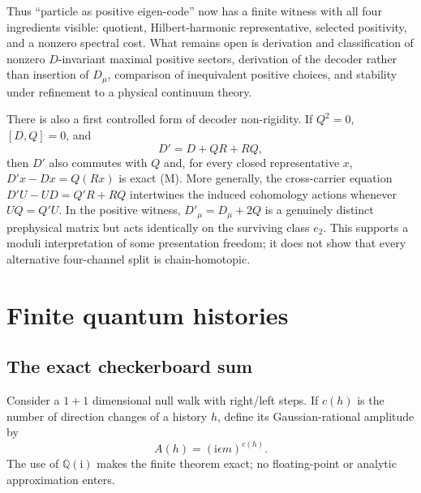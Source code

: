 \documentclass[11pt]{article}
\newcommand{\Mtag}{\textcolor{verified}{\textsc{M}}}
\newcommand{\ii}{\mathrm{i}}
\newcommand{\Q}{\mathbb{Q}}
\begin{document}
Thus ``particle as positive eigen-code'' now has a finite witness with all four
ingredients visible: quotient, Hilbert-harmonic representative, selected
positivity, and a nonzero spectral cost.  What remains open is derivation and
classification of nonzero $D$-invariant maximal positive sectors, derivation of
the decoder rather than insertion of $D_\mu$, comparison of inequivalent
positive choices, and stability under refinement to a physical continuum
theory.

There is also a first controlled form of decoder non-rigidity.  If $Q^2=0$,
$[D,Q]=0$, and
\begin{equation}\label{eq:chainGauge}
  D'=D+QR+RQ,
\end{equation}
then $D'$ also commutes with $Q$ and, for every closed representative $x$,
$D'x-Dx=Q(Rx)$ is exact (\Mtag).  More generally, the cross-carrier equation
$D'U-UD=Q'R+RQ$ intertwines the induced cohomology actions whenever
$UQ=Q'U$.  In the positive witness, $D'_\mu=D_\mu+2Q$ is a genuinely distinct
prephysical matrix but acts identically on the surviving class $e_2$.  This
supports a moduli interpretation of some presentation freedom; it does not show
that every alternative four-channel split is chain-homotopic.

\section{Finite quantum histories}

\subsection{The exact checkerboard sum}

Consider a $1+1$ dimensional null walk with right/left steps.  If $c(h)$ is the
number of direction changes of a history $h$, define its Gaussian-rational
amplitude by
\begin{equation}\label{eq:historyamp}
  A(h)=(\ii\epsilon m)^{c(h)}.
\end{equation}
The use of $\Q(\ii)$ makes the finite theorem exact; no floating-point or
analytic approximation enters.
\end{document}
